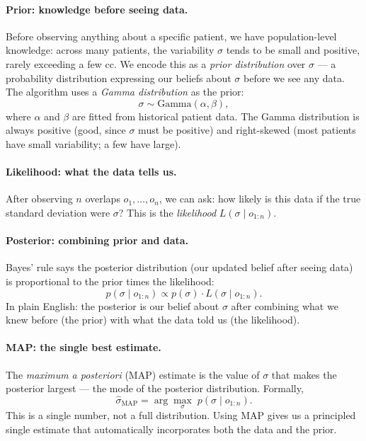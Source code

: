 \documentclass[11pt]{article}
\theoremstyle{definition}
\begin{document}
\paragraph{Prior: knowledge before seeing data.}
Before observing anything about a specific patient, we have population-level
knowledge: across many patients, the variability $\sigma$ tends to be small
and positive, rarely exceeding a few cc.  We encode this as a
\emph{prior distribution} over $\sigma$ --- a probability distribution
expressing our beliefs about $\sigma$ before we see any data.  The
algorithm uses a \emph{Gamma distribution} as the prior:
\[
  \sigma \sim \mathrm{Gamma}(\alpha, \beta),
\]
where $\alpha$ and $\beta$ are fitted from historical patient data.  The
Gamma distribution is always positive (good, since $\sigma$ must be positive)
and right-skewed (most patients have small variability; a few have large).

\paragraph{Likelihood: what the data tells us.}
After observing $n$ overlaps $o_1, \ldots, o_n$, we can ask: how likely is
this data if the true standard deviation were $\sigma$?  This is the
\emph{likelihood} $L(\sigma \mid o_{1:n})$.

\paragraph{Posterior: combining prior and data.}
Bayes' rule says the posterior distribution (our updated belief after seeing
data) is proportional to the prior times the likelihood:
\[
  p(\sigma \mid o_{1:n}) \propto p(\sigma) \cdot L(\sigma \mid o_{1:n}).
\]
In plain English: the posterior is our belief about $\sigma$ after combining
what we knew before (the prior) with what the data told us (the likelihood).

\paragraph{MAP: the single best estimate.}
The \emph{maximum a posteriori} (MAP) estimate is the value of $\sigma$ that
makes the posterior largest --- the mode of the posterior distribution.
Formally,
\[
  \hat{\sigma}_{\mathrm{MAP}} = \arg\max_{\sigma}\; p(\sigma \mid o_{1:n}).
\]
This is a single number, not a full distribution.  Using MAP gives us a
principled single estimate that automatically incorporates both the data and
the prior.
\end{document}
